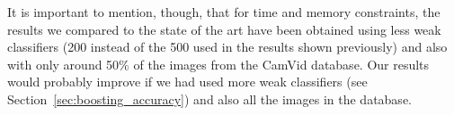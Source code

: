 It is important to mention, though, that for time and memory constraints, the results we compared to the state of the art have been obtained using less weak classifiers (200 instead of the 500 used in the results shown previously) and also with only around 50\% of the images from the CamVid database. Our results would probably improve if we had used more weak classifiers (see Section~\ref{sec:boosting_accuracy}) and also all the images in the database.








